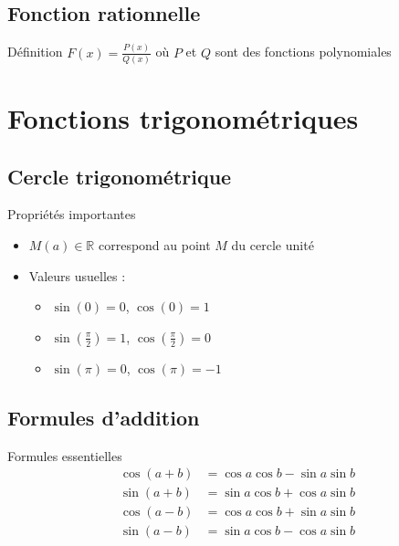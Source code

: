 \documentclass[a4paper,11pt]{article}
\begin{document}
\subsection{Fonction rationnelle}

\begin{defbox}{Définition}
$F(x) = \frac{P(x)}{Q(x)}$ où $P$ et $Q$ sont des fonctions polynomiales
\end{defbox}

\section{Fonctions trigonométriques}

\subsection{Cercle trigonométrique}

\begin{propbox}{Propriétés importantes}
\begin{itemize}
    \item $M(a) \in \mathbb{R}$ correspond au point $M$ du cercle unité
    \item Valeurs usuelles : 
    \begin{itemize}
        \item $\sin(0) = 0$, $\cos(0) = 1$
        \item $\sin(\frac{\pi}{2}) = 1$, $\cos(\frac{\pi}{2}) = 0$
        \item $\sin(\pi) = 0$, $\cos(\pi) = -1$
    \end{itemize}
\end{itemize}
\end{propbox}

\subsection{Formules d'addition}

\begin{propbox}{Formules essentielles}
\begin{align*}
\cos(a + b) &= \cos a \cos b - \sin a \sin b \\
\sin(a + b) &= \sin a \cos b + \cos a \sin b \\
\cos(a - b) &= \cos a \cos b + \sin a \sin b \\
\sin(a - b) &= \sin a \cos b - \cos a \sin b
\end{align*}
\end{propbox}
\end{document}
